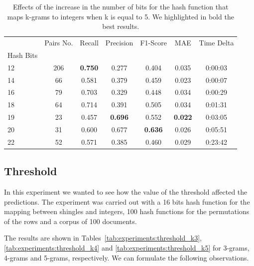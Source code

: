 \documentclass[runningheads]{llncs}
\begin{document}
\begin{table}
  \caption{Effects of the increase in the number of bits for the hash function that maps k-grams to integers when k is equal to 5. We highlighted in bold the best results.}
  \label{tab:experiments:buckets_k5}
  \centering
  \begin{tabular}{lcccccc}
    \toprule
    {} &  Pairs No. &  Recall &  Precision &  F1-Score &    MAE & Time Delta \\
    Hash Bits &            &         &            &           &        &            \\
    \midrule
    12        &        206 &   \textbf{0.750} &      0.277 &     0.404 &  0.035 &    0:00:03 \\
    14        &         66 &   0.581 &      0.379 &     0.459 &  0.023 &    0:00:07 \\
    16        &         79 &   0.703 &      0.329 &     0.448 &  0.034 &    0:00:29 \\
    18        &         64 &   0.714 &      0.391 &     0.505 &  0.034 &    0:01:31 \\
    19        &         23 &   0.457 &      \textbf{0.696} &     0.552 &  \textbf{0.022} &    0:03:05 \\
    20        &         31 &   0.600 &      0.677 &     \textbf{0.636} &  0.026 &    0:05:51 \\
    22        &         52 &   0.571 &      0.385 &     0.460 &  0.029 &    0:23:42 \\
    \bottomrule
    \end{tabular}
\end{table}

\subsection{Threshold}
\label{subsec:experiments:threshold}

In this experiment we wanted to see how the value of the threshold affected the predictions. The experiment was carried out with a 16 bits hash function for the mapping between shingles and integers, 100 hash functions for the permutations of the rows and a corpus of 100 documents.

The results are shown in Tables~\ref{tab:experiments:threshold_k3}, \ref{tab:experiments:threshold_k4} and \ref{tab:experiments:threshold_k5} for 3-grams, 4-grams and 5-grams, respectively. We can formulate the following observations.
\end{document}
